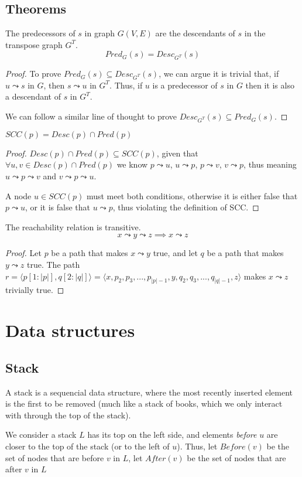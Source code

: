 \subsection{Theorems}
\begin{theorem}
    The predecessors of $s$ in graph $G(V,E)$ are the descendants of $s$ in the transpose graph $G^T$.
    \begin{equation*}
        Pred_{G}(s)=Desc_{G^T}(s)
    \end{equation*}
\end{theorem}
\begin{proof}
    To prove $Pred_G(s) \subseteq Desc_{G^T}(s)$, we can argue it is trivial that, if $u \leadsto s$ in $G$, then $s \leadsto u$ in $G^T$. Thus, if $u$ is a predecessor of $s$ in $G$ then it is also a descendant of $s$ in $G^T$.\par
    We can follow a similar line of thought to prove $Desc_{G^T}(s) \subseteq Pred_G(s)$.
\end{proof}
\begin{theorem} \label{teor:scc}
    $SCC(p)=Desc(p) \cap Pred(p)$
\end{theorem}
\begin{proof}
    $Desc(p) \cap Pred(p) \subseteq SCC(p)$, given that $\forall u, v \in Desc(p) \cap Pred(p)$ we know $p \leadsto u$, $u \leadsto p$, $p \leadsto v$, $v \leadsto p$, thus meaning $u \leadsto p \leadsto v$ and $v \leadsto p \leadsto u$.\par
    A node $u \in SCC(p)$ must meet both conditions, otherwise it is either false that $p \leadsto u$, or it is false that $u \leadsto p$, thus violating the definition of \acrshort{SCC}.
\end{proof}
\begin{theorem}
    The reachability relation is transitive.
    \begin{equation*}
        x \leadsto y \leadsto z \implies x \leadsto z
    \end{equation*}
\end{theorem}
\begin{proof}
Let $p$ be a path that makes $x \leadsto y$ true, and let $q$ be a path that makes $y \leadsto z$ true. The path $r = \langle p[1:|p|], q[2:|q|] \rangle = \langle x, p_2, p_3,...,p_{|p|-1},y,q_2,q_3,...,q_{|q|-1}, z \rangle$ makes $x \leadsto z$ trivially true.
\end{proof}
\section{Data structures}
\subsection{Stack}
A stack is a sequencial data structure, where the most recently inserted element is the first to be removed (much like a stack of books, which we only interact with through the top of the stack).\par
We consider a stack $L$ has its top on the left side, and elements \emph{before} $u$ are closer to the top of the stack (or to the left of $u$). Thus, let $Before(v)$ be the set of nodes that are before $v$ in $L$, let $After(v)$ be the set of nodes that are after $v$ in $L$
